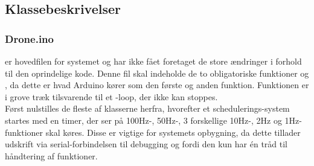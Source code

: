 \documentclass[Main]{subfiles}
\begin{document}
\subsection{Klassebeskrivelser}

\subsubsection{Drone.ino}
 er hovedfilen for systemet og har ikke fået foretaget de store ændringer i forhold til den oprindelige kode.
Denne fil skal indeholde de to obligatoriske funktioner  og , da dette er hvad Arduino kører som den første og anden funktion.
Funktionen  er i grove træk tilsvarende til et -loop, der ikke kan stoppes.
\\
Først nulstilles de fleste af klasserne herfra, hvorefter et schedulerings-system startes med en timer, der ser på 100Hz-, 50Hz-, 3 forskellige 10Hz-, 2Hz og 1Hz-funktioner skal køres. 
Disse er vigtige for systemets opbygning, da dette tillader udskrift via serial-forbindelsen til debugging og fordi den kun har én tråd til håndtering af funktioner.

\begin{Function}
\end{Function}


\begin{Function}
\end{Function}


\begin{Function}
\end{Function}
\end{document}

